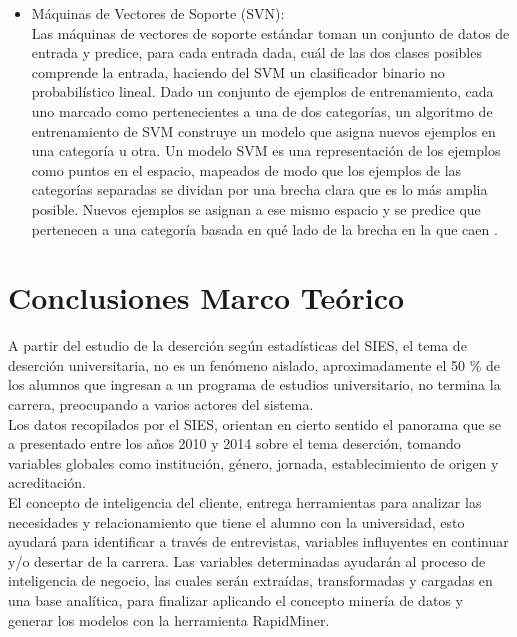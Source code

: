 \begin{itemize}
	\item Máquinas de Vectores de Soporte (SVN):\\

Las máquinas de vectores de soporte estándar toman un conjunto de datos de entrada y predice, para cada entrada dada, cuál de las dos clases posibles comprende la entrada, haciendo del SVM un clasificador binario no probabilístico lineal. Dado un conjunto de ejemplos de entrenamiento, cada uno marcado como pertenecientes a una de dos categorías, un algoritmo de entrenamiento de SVM construye un modelo que asigna nuevos ejemplos en una categoría u otra. Un modelo SVM es una representación de los ejemplos como puntos en el espacio, mapeados de modo que los ejemplos de las categorías separadas se dividan por una brecha clara que es lo más amplia posible. Nuevos ejemplos se asignan a ese mismo espacio y se predice que pertenecen a una categoría basada en qué lado de la brecha en la que caen \cite{svn}.

\end{itemize}  


\section{Conclusiones Marco Teórico}

A partir del estudio de la deserción según estadísticas del SIES, el tema de deserción universitaria, no es un fenómeno aislado, aproximadamente el 50 \%  de los alumnos que ingresan a un programa de estudios universitario, no termina la carrera, preocupando a varios actores del sistema.\\

Los datos recopilados por el SIES, orientan en cierto sentido el panorama que se a presentado entre los años 2010 y 2014 sobre el tema deserción, tomando variables globales como institución, género, jornada, establecimiento de origen y acreditación.\\

El concepto de inteligencia del cliente, entrega herramientas para analizar las necesidades y relacionamiento que tiene el alumno con la universidad, esto ayudará para identificar a través de entrevistas, variables influyentes en continuar y/o desertar de la carrera. Las variables determinadas ayudarán al proceso de inteligencia de negocio, las cuales serán extraídas, transformadas y cargadas en una base analítica, para finalizar aplicando el concepto minería de datos y generar los modelos con la herramienta RapidMiner.












